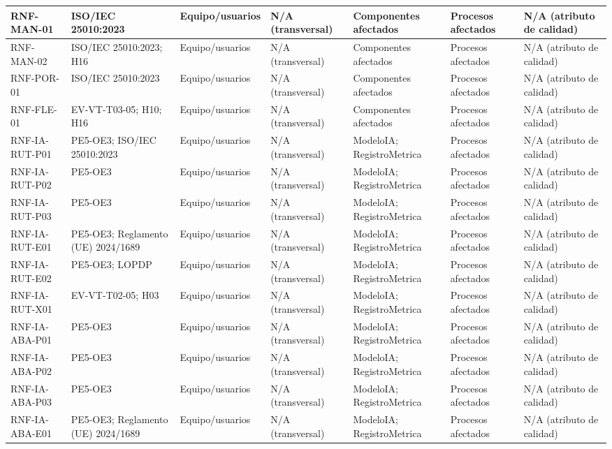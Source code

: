 \begin{landscape}
\begin{longtable}{|p{1.8cm}|p{3.4cm}|p{2.0cm}|p{1.4cm}|p{5.0cm}|p{4.0cm}|p{3.2cm}|}
RNF-MAN-01 & ISO/IEC 25010:2023 & Equipo/usuarios & N/A (transversal) & Componentes afectados & Procesos afectados & N/A (atributo de calidad) \\ \hline
RNF-MAN-02 & ISO/IEC 25010:2023; H16 & Equipo/usuarios & N/A (transversal) & Componentes afectados & Procesos afectados & N/A (atributo de calidad) \\ \hline
RNF-POR-01 & ISO/IEC 25010:2023 & Equipo/usuarios & N/A (transversal) & Componentes afectados & Procesos afectados & N/A (atributo de calidad) \\ \hline
RNF-FLE-01 & EV-VT-T03-05; H10; H16 & Equipo/usuarios & N/A (transversal) & Componentes afectados & Procesos afectados & N/A (atributo de calidad) \\ \hline
RNF-IA-RUT-P01 & PE5-OE3; ISO/IEC 25010:2023 & Equipo/usuarios & N/A (transversal) & ModeloIA; RegistroMetrica & Procesos afectados & N/A (atributo de calidad) \\ \hline
RNF-IA-RUT-P02 & PE5-OE3 & Equipo/usuarios & N/A (transversal) & ModeloIA; RegistroMetrica & Procesos afectados & N/A (atributo de calidad) \\ \hline
RNF-IA-RUT-P03 & PE5-OE3 & Equipo/usuarios & N/A (transversal) & ModeloIA; RegistroMetrica & Procesos afectados & N/A (atributo de calidad) \\ \hline
RNF-IA-RUT-E01 & PE5-OE3; Reglamento (UE) 2024/1689 & Equipo/usuarios & N/A (transversal) & ModeloIA; RegistroMetrica & Procesos afectados & N/A (atributo de calidad) \\ \hline
RNF-IA-RUT-E02 & PE5-OE3; LOPDP & Equipo/usuarios & N/A (transversal) & ModeloIA; RegistroMetrica & Procesos afectados & N/A (atributo de calidad) \\ \hline
RNF-IA-RUT-X01 & EV-VT-T02-05; H03 & Equipo/usuarios & N/A (transversal) & ModeloIA; RegistroMetrica & Procesos afectados & N/A (atributo de calidad) \\ \hline
RNF-IA-ABA-P01 & PE5-OE3 & Equipo/usuarios & N/A (transversal) & ModeloIA; RegistroMetrica & Procesos afectados & N/A (atributo de calidad) \\ \hline
RNF-IA-ABA-P02 & PE5-OE3 & Equipo/usuarios & N/A (transversal) & ModeloIA; RegistroMetrica & Procesos afectados & N/A (atributo de calidad) \\ \hline
RNF-IA-ABA-P03 & PE5-OE3 & Equipo/usuarios & N/A (transversal) & ModeloIA; RegistroMetrica & Procesos afectados & N/A (atributo de calidad) \\ \hline
RNF-IA-ABA-E01 & PE5-OE3; Reglamento (UE) 2024/1689 & Equipo/usuarios & N/A (transversal) & ModeloIA; RegistroMetrica & Procesos afectados & N/A (atributo de calidad) \\ \hline

\end{longtable}
\end{landscape}
